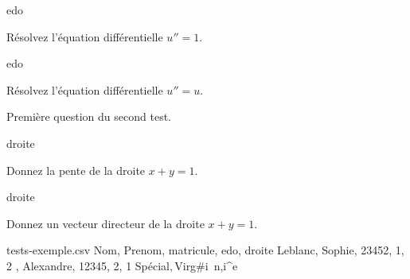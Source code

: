 \documentclass[12pt,a4paper, rulers]{tests}
\begin{document}
\vspace{3ex}

\begin{namequestion}{edo}%
  \begin{question}
    Résolvez l'équation différentielle $u'' = 1$.
  \end{question}
\end{namequestion}
\begin{namequestion}{edo}%
  \begin{question}
    Résolvez l'équation différentielle $u'' = u$.
  \end{question}
\end{namequestion}


\exam
{}
\maketitle %

\begin{question}
  Première question du second test.
\end{question}


\begin{namequestion}{droite}
  \begin{question}
    Donnez la pente de la droite $x + y = 1$.    
  \end{question}
\end{namequestion}
\begin{namequestion}{droite}
  \begin{question}
    Donnez un vecteur directeur de la droite $x + y = 1$.    
  \end{question}
\end{namequestion}

\begin{filecontents*}{tests-exemple.csv}
Nom, Prenom, matricule, edo, droite
Leblanc, Sophie, 23452, 1, 2
       , Alexandre, 12345, 2, 1
Spécial$, $Virg#i~n{,}i^e%
\end{filecontents*}

\end{document}
